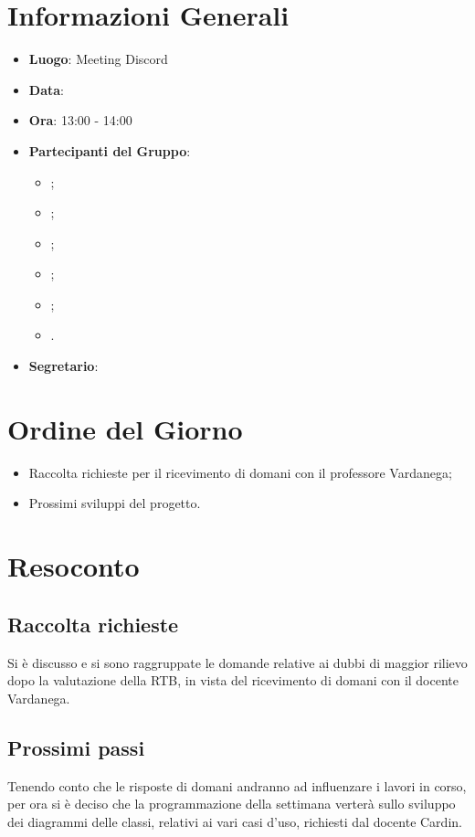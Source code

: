 \section{Informazioni Generali}

\begin{itemize}
\item{\textbf{Luogo}}: Meeting Discord
\item{\textbf{Data}}: \D
\item{\textbf{Ora}}: 13:00 - 14:00
\item{\textbf{Partecipanti del Gruppo}}: 
	\begin{itemize}
	\item{\EP{};} 
	\item{\FP{};}
	\item{\GC{};}
	\item{\LW{};}
	\item{\MG{};}
	\item{\PV{}.}
	\end{itemize} 
\item{\textbf{Segretario}}: \PV{}	
\end{itemize}

\section{Ordine del Giorno}
\begin{itemize}
\item{Raccolta richieste per il ricevimento di domani con il professore Vardanega;}
\item{Prossimi sviluppi del progetto.}
\end{itemize}

\section{Resoconto}
 
\subsection{Raccolta richieste}
Si è discusso e si sono raggruppate le domande relative ai dubbi di maggior rilievo dopo la valutazione della RTB, in vista del ricevimento di domani con il docente Vardanega.

\subsection{Prossimi passi}
Tenendo conto che le risposte di domani andranno ad influenzare i lavori in corso, per ora si è deciso che la programmazione della settimana verterà sullo sviluppo dei diagrammi delle classi, relativi ai vari casi d'uso, richiesti dal docente Cardin.
